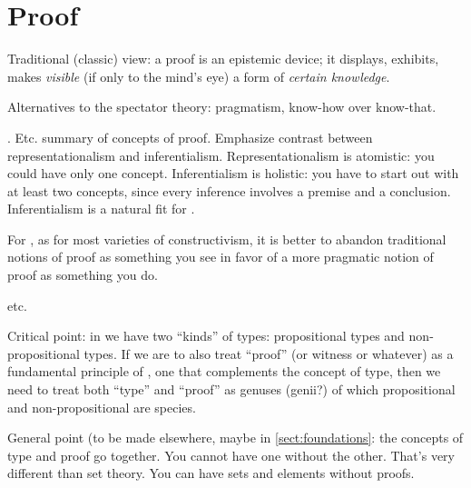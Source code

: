 \section{Proof}
\label{sect:proof}

Traditional (classic) view: a proof is an epistemic device; it
displays, exhibits, makes \textit{visible} (if only to the mind's eye)
a form of \textit{certain knowledge}.

Alternatives to the spectator theory: pragmatism, know-how over know-that.

{\todo.  Etc. summary of concepts of proof.  Emphasize contrast
  between representationalism and inferentialism.  Representationalism
  is atomistic: you could have only one concept.  Inferentialism is
  holistic: you have to start out with at least two concepts, since
  every inference involves a premise and a conclusion.  Inferentialism
  is a natural fit for \HoTT.}


For \HoTT{}, as for most varieties of constructivism, it is better to
abandon traditional notions of proof as something you see in favor of a
more pragmatic notion of proof as something you do.

etc.

Critical point: in \HoTT we have two ``kinds'' of types: propositional
types and non-propositional types.  If we are to also treat ``proof''
(or witness or whatever) as a fundamental principle of \HoTT, one that
complements the concept of type, then we need to treat both ``type''
and ``proof'' as genuses (genii?) of which propositional and non-propositional
are species.

\begin{remark}
  General point (to be made elsewhere, maybe in
  \cref{sect:foundations}: the concepts of type and proof go together.
  You cannot have one without the other.  That's very different than
  set theory.  You can have sets and elements without proofs.
\end{remark}



